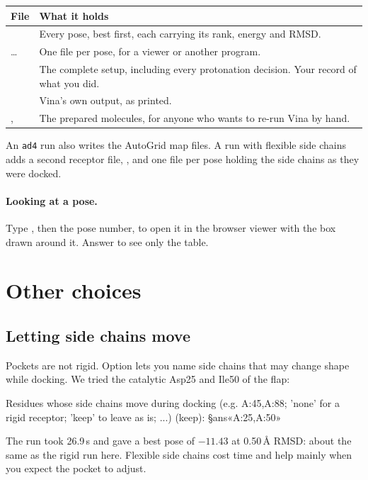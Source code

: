 \begin{tabularx}{\linewidth}{@{}lL@{}}
\toprule
\textbf{File} & \textbf{What it holds} \\
\midrule
{} & Every pose, best first, each carrying its rank, energy and
  RMSD. \\
 \dots & One file per pose, for a viewer or another program. \\
 & The complete setup, including every protonation
  decision. Your record of what you did. \\
 & Vina's own output, as printed. \\
,  & The prepared molecules, for
  anyone who wants to re-run Vina by hand. \\
\bottomrule
\end{tabularx}

\medskip
An \texttt{ad4} run also writes the AutoGrid map files. A run with flexible
side chains adds a second receptor file,
, and one file per pose holding the side chains as
they were docked.

\paragraph{Looking at a pose.} Type , then the pose number, to open it
in the browser viewer with the box drawn around it. Answer  to see
only the table.

\section{Other choices}

\subsection{Letting side chains move}

Pockets are not rigid. Option  lets you name side chains that may
change shape while docking. We tried the catalytic Asp25 and Ile50 of the flap:

\begin{screen}
Residues whose side chains move during docking (e.g. A:45,A:88; 'none' for
a rigid receptor; 'keep' to leave as is; ...) (keep): §ans«A:25,A:50»
\end{screen}

The run took 26.9\,s and gave a best pose of $-11.43$ at 0.50\,\AA{} RMSD:
about the same as the rigid run here. Flexible side chains cost time and help
mainly when you expect the pocket to adjust.

